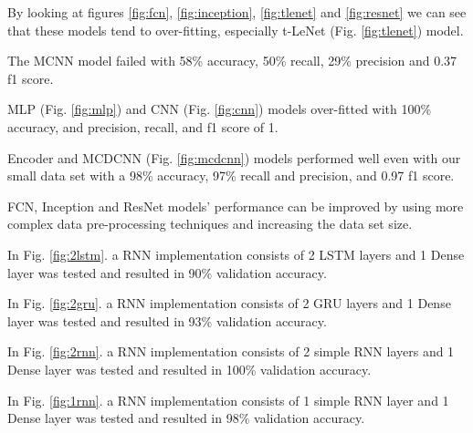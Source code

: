 \documentclass[conference]{IEEEtran}
\begin{document}
By looking at figures \ref{fig:fcn}, \ref{fig:inception}, \ref{fig:tlenet} and \ref{fig:resnet} we can see that these models tend to over-fitting, especially t-LeNet (Fig. \ref{fig:tlenet}) model. 

The MCNN model failed with 58\% accuracy, 50\% recall, 29\% precision and 0.37 f1 score. 

MLP (Fig. \ref{fig:mlp}) and CNN (Fig. \ref{fig:cnn}) models over-fitted with 100\% accuracy, and precision, recall, and f1 score of 1. 

Encoder and MCDCNN (Fig. \ref{fig:mcdcnn}) models performed well even with our small data set with a 98\% accuracy, 97\% recall and precision, and 0.97 f1 score. 

FCN, Inception and ResNet models' performance can be improved by using more complex data pre-processing techniques and increasing the data set size. 

In Fig. \ref{fig:2lstm}. a RNN implementation consists of 2 LSTM layers and 1 Dense layer was tested and resulted in 90\% validation accuracy.

In Fig. \ref{fig:2gru}. a RNN implementation consists of 2 GRU layers and 1 Dense layer was tested and resulted in 93\% validation accuracy.

In Fig. \ref{fig:2rnn}. a RNN implementation consists of 2 simple RNN layers and 1 Dense layer was tested and resulted in 100\% validation accuracy.

In Fig. \ref{fig:1rnn}. a RNN implementation consists of 1 simple RNN layer and 1 Dense layer was tested and resulted in 98\% validation accuracy.
\end{document}
